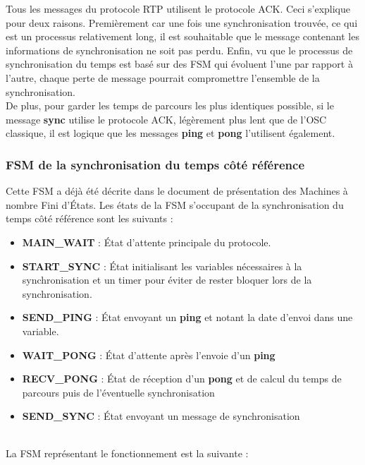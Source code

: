 Tous les messages du protocole RTP utilisent le protocole ACK. Ceci s'explique pour deux raisons. Premièrement car une fois une synchronisation trouvée, ce qui est un processus relativement long, il est souhaitable que le message contenant les informations de synchronisation ne soit pas perdu.\p
Enfin, vu que le processus de synchronisation du temps est basé sur des FSM qui évoluent l'une par rapport à l'autre, chaque perte de message pourrait compromettre l'ensemble de la synchronisation.\\
De plus, pour garder les temps de parcours les plus identiques possible, si le message \textbf{sync} utilise le protocole ACK, légèrement plus lent que de l'OSC classique, il est logique que les messages \textbf{ping} et \textbf{pong} l'utilisent également.

\subsubsection{FSM de la synchronisation du temps côté référence}
Cette FSM a déjà été décrite dans le document de présentation des Machines à nombre Fini d'États\citep{document_ImplementationdesMachinesanombreFinidEtats_}.\p
Les états de la FSM s'occupant de la synchronisation du temps côté référence sont les suivants :\\
\begin{itemize}
\item \textbf{MAIN\_WAIT} : État d'attente principale du protocole.
\item \textbf{START\_SYNC} : État initialisant les variables nécessaires à la synchronisation et un timer pour éviter de rester bloquer lors de la synchronisation.
\item \textbf{SEND\_PING} : État envoyant un \textbf{ping} et notant la date d'envoi dans une variable.
\item \textbf{WAIT\_PONG} : État d'attente après l'envoie d'un \textbf{ping}
\item \textbf{RECV\_PONG} : État de réception d'un \textbf{pong} et de calcul du temps de parcours puis de l'éventuelle synchronisation
\item \textbf{SEND\_SYNC} : État envoyant un message de synchronisation 
\end{itemize}~\\
La FSM représentant le fonctionnement est la suivante :~\\
